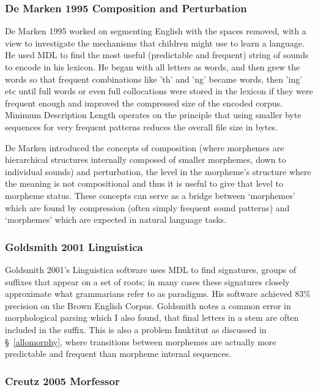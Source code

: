 \documentclass[runningheads,a4paper]{llncs}
\begin{document}
\subsubsection{De Marken 1995 Composition and Perturbation}

De Marken 1995 worked on segmenting English with the spaces removed, with a view to investigate the mechanisms that children might use to learn a language. He used MDL to find the most useful (predictable and frequent) string of sounds to encode in his lexicon. He began with all letters as words, and then grew the words so that frequent combinations like 'th' and 'ng' became words, then 'ing' etc until full words or even full collocations were stored in the lexicon if they were frequent enough and improved the compressed size of the encoded corpus. Minimum Description Length operates on the principle that using smaller byte sequences for very frequent patterns reduces the overall file size in bytes.

 De Marken introduced the concepts of composition (where morphemes are hierarchical structures internally composed of smaller morphemes, down to individual sounds) and perturbation, the level in the morpheme's structure where the meaning is not compositional and thus it is useful to give that level to morpheme status. These concepts can serve as a bridge between `morphemes' which are found by compression (often simply frequent sound patterns) and `morphemes' which are expected in natural language tasks. 
 
\subsubsection{Goldsmith 2001 Linguistica} 

Goldsmith 2001's Linguistica software uses MDL to find signatures, groups of suffixes that appear on a set of roots; in many cases these signatures closely approximate what grammarians refer to as paradigms. His software achieved 83\% precision on the Brown English Corpus. Goldsmith notes a common error in morphological parsing which I also found, that final letters in a stem are often included in the suffix. This is also a problem Inuktitut as discussed in \S~\ref{allomorphy}, where transitions between morphemes are actually more predictable and frequent than morpheme internal sequences. 

\subsubsection{Creutz 2005 Morfessor}
\end{document}
